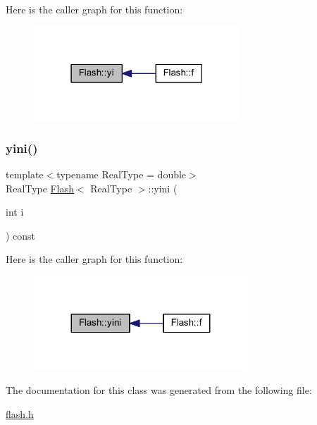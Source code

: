 Here is the caller graph for this function\+:\nopagebreak
\begin{figure}[H]
\begin{center}
\leavevmode
\includegraphics[width=219pt]{class_flash_a79622eee2bd4ec63c7d04c50603119a0_icgraph}
\end{center}
\end{figure}
\mbox{\label{class_flash_a7667f4e5e1df4abe07bf12b4e7696a81}} 
\subsubsection{\texorpdfstring{yini()}{yini()}}
{\footnotesize\ttfamily template$<$typename Real\+Type = double$>$ \\
Real\+Type \mbox{\hyperlink{class_flash}{Flash}}$<$ Real\+Type $>$\+::yini (\begin{DoxyParamCaption}\item[{int}]{i }\end{DoxyParamCaption}) const\hspace{0.3cm}{\ttfamily [inline]}}

Here is the caller graph for this function\+:\nopagebreak
\begin{figure}[H]
\begin{center}
\leavevmode
\includegraphics[width=227pt]{class_flash_a7667f4e5e1df4abe07bf12b4e7696a81_icgraph}
\end{center}
\end{figure}


The documentation for this class was generated from the following file\+:\begin{DoxyCompactItemize}
\item 
\mbox{\hyperlink{flash_8h}{flash.\+h}}\end{DoxyCompactItemize}
